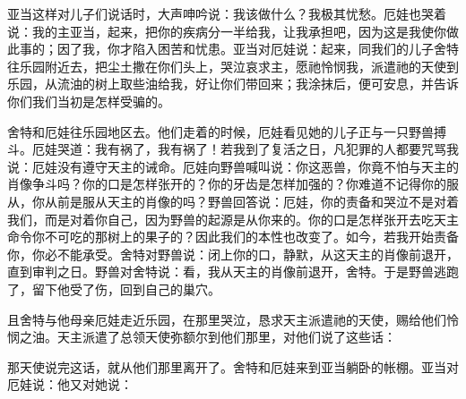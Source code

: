 亚当这样对儿子们说话时，大声呻吟说：我该做什么？我极其忧愁。厄娃也哭着说：我的主亚当，起来，把你的疾病分一半给我，让我承担吧，因为这是我使你做此事的；因了我，你才陷入困苦和忧患。亚当对厄娃说：起来，同我们的儿子舍特往乐园附近去，把尘土撒在你们头上，哭泣哀求主，愿祂怜悯我，派遣祂的天使到乐园，从流油的树上取些油给我，好让你们带回来；我涂抹后，便可安息，并告诉你们我们当初是怎样受骗的。\par

舍特和厄娃往乐园地区去。他们走着的时候，厄娃看见她的儿子正与一只野兽搏斗。厄娃哭道：我有祸了，我有祸了！若我到了复活之日，凡犯罪的人都要咒骂我说：厄娃没有遵守天主的诫命。厄娃向野兽喊叫说：你这恶兽，你竟不怕与天主的肖像争斗吗？你的口是怎样张开的？你的牙齿是怎样加强的？你难道不记得你的服从，你从前是服从天主的肖像的吗？野兽回答说：厄娃，你的责备和哭泣不是对着我们，而是对着你自己，因为野兽的起源是从你来的。你的口是怎样张开去吃天主命令你不可吃的那树上的果子的？因此我们的本性也改变了。如今，若我开始责备你，你必不能承受。舍特对野兽说：闭上你的口，静默，从这天主的肖像前退开，直到审判之日。野兽对舍特说：看，我从天主的肖像前退开，舍特。于是野兽逃跑了，留下他受了伤，回到自己的巢穴。\par

且舍特与他母亲厄娃走近乐园，在那里哭泣，恳求天主派遣祂的天使，赐给他们怜悯之油。天主派遣了总领天使弥额尔到他们那里，对他们说了这些话：\par

那天使说完这话，就从他们那里离开了。舍特和厄娃来到亚当躺卧的帐棚。亚当对厄娃说：他又对她说：\par

